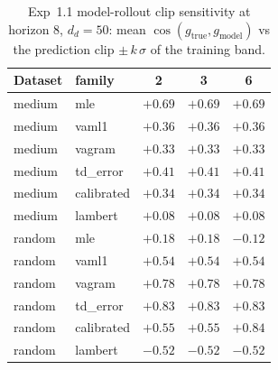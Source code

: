 \begin{table}[htbp]
\centering
\caption{Exp~1.1 model-rollout clip sensitivity at horizon 8, $d_d = 50$: mean $\cos(g_{\text{true}}, g_{\text{model}})$ vs the prediction clip $\pm\,k\,\sigma$ of the training band.}
\label{tab:h11clip}
\begin{tabular}{llccc}
\toprule
Dataset & family & 2 & 3 & 6 \\
\midrule
medium & mle & $+0.69$ & $+0.69$ & $+0.69$ \\
medium & vaml1 & $+0.36$ & $+0.36$ & $+0.36$ \\
medium & vagram & $+0.33$ & $+0.33$ & $+0.33$ \\
medium & td_error & $+0.41$ & $+0.41$ & $+0.41$ \\
medium & calibrated & $+0.34$ & $+0.34$ & $+0.34$ \\
medium & lambert & $+0.08$ & $+0.08$ & $+0.08$ \\
random & mle & $+0.18$ & $+0.18$ & $-0.12$ \\
random & vaml1 & $+0.54$ & $+0.54$ & $+0.54$ \\
random & vagram & $+0.78$ & $+0.78$ & $+0.78$ \\
random & td_error & $+0.83$ & $+0.83$ & $+0.83$ \\
random & calibrated & $+0.55$ & $+0.55$ & $+0.84$ \\
random & lambert & $-0.52$ & $-0.52$ & $-0.52$ \\
\bottomrule
\end{tabular}
\end{table}

